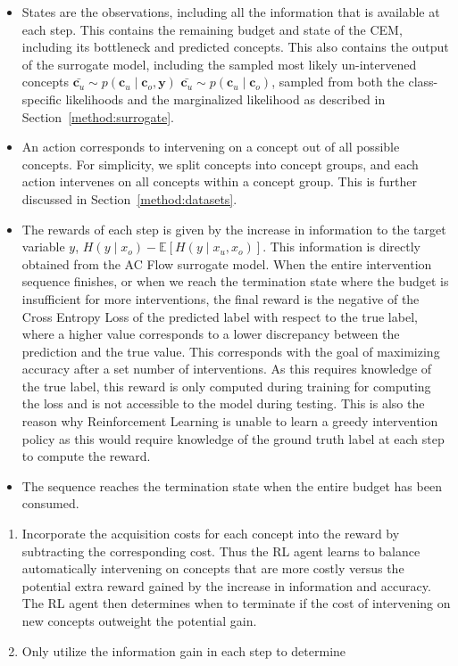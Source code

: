 \documentclass[../main.tex]{subfiles}
\begin{document}
\begin{itemize}
    \item States are the observations, including all the information that is available
    at each step. This contains the remaining budget and 
    state of the CEM, including its bottleneck and predicted concepts.
    This also contains the output of the surrogate model, 
    including the sampled most likely un-intervened concepts 
    $\bar{\mathbf{c}_u} \sim p(\mathbf{c}_u \mid \mathbf{c}_o, \mathbf{y})$
    $\bar{\mathbf{c}_u} \sim p(\mathbf{c}_u \mid \mathbf{c}_o)$, sampled from
    both the class-specific likelihoods and the marginalized likelihood
    as described in Section~\ref{method:surrogate}.
    \item An action corresponds to intervening on a concept out of all possible concepts.
    For simplicity, we split concepts into concept groups, and each action intervenes on all concepts
    within a concept group. This is further discussed in Section~\ref{method:datasets}.
    \item The rewards of each step is given by the increase in 
    information to the target variable $y$, $H(y \mid x_o) - \mathbb{E} [H(y \mid x_u, x_o)]$. This information
    is directly obtained from the AC Flow surrogate model. When the entire intervention sequence finishes,
    or when we reach the termination state where the budget is insufficient for more interventions,
    the final reward is the negative of the Cross Entropy Loss of the predicted label with respect to the 
    true label, where a higher value corresponds to 
    a lower discrepancy between the prediction and the true value. This corresponds with the goal of 
    maximizing accuracy after a set number of interventions. As this requires knowledge of the true label,
    this reward is only computed during training for computing the loss
    and is not accessible to the model during testing. This is also the reason why
    Reinforcement Learning is unable to learn a greedy intervention policy as this would
    require knowledge of the ground truth label at each step to compute the reward.
    \item The sequence reaches the termination state when the entire budget has been consumed.
    
\end{itemize}


\begin{enumerate}
    \item Incorporate the acquisition costs for each concept into the reward by subtracting
    the corresponding cost. Thus the RL agent
    learns to balance automatically intervening on concepts that are more costly versus the
    potential extra reward gained by the increase in information and accuracy. The RL agent then determines when to terminate
    if the cost of intervening on new concepts outweight the potential gain.
    \item Only utilize the information gain in each step to determine 
    
\end{enumerate}
\end{document}
